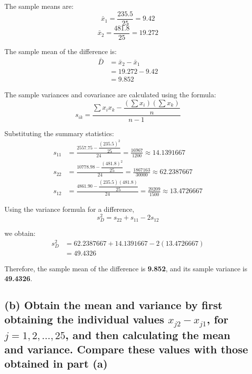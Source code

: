 \documentclass[12pt]{article}
\begin{document}
\vspace{0.2cm}

The sample means are:
\[
\bar{x}_1 = \frac{235.5}{25} = 9.42
\]
\[
\bar{x}_2 = \frac{481.8}{25} = 19.272
\]

\vspace{0.2cm}

The sample mean of the difference is:
\begin{align*}
\bar{D} &= \bar{x}_2 - \bar{x}_1 \\
&= 19.272 - 9.42 \\
&= \boxed{9.852}
\end{align*}

\vspace{0.2cm}

The sample variances and covariance are calculated using the formula:
\[
s_{ik} = \frac{\sum x_i x_k - \dfrac{(\sum x_i)(\sum x_k)}{n}}{n - 1}
\]

\vspace{0.2cm}

Substituting the summary statistics:
\begin{align*}
s_{11} &= \frac{2557.75 - \dfrac{(235.5)^2}{25}}{24} = \frac{16967}{1200} \approx 14.1391667 \\[1em]
s_{22} &= \frac{10778.98 - \dfrac{(481.8)^2}{25}}{24} = \frac{1867163}{30000} \approx 62.2387667 \\[1em]
s_{12} &= \frac{4861.90 - \dfrac{(235.5)(481.8)}{25}}{24} = \frac{20209}{1500} \approx 13.4726667
\end{align*}

\vspace{0.2cm}

Using the variance formula for a difference,
\[
s_D^2 = s_{22} + s_{11} - 2s_{12}
\]

\vspace{0.2cm}

we obtain:
\begin{align*}
s_D^2 &= 62.2387667 + 14.1391667 - 2(13.4726667) \\
&= \boxed{49.4326}
\end{align*}

\vspace{0.2cm}

Therefore, the sample mean of the difference is \textbf{9.852}, and its sample variance is \textbf{49.4326}.

\vspace{0.2cm}

\subsection*{(b) Obtain the mean and variance by first obtaining the individual values $x_{j2} - x_{j1}$, for $j = 1, 2, \dots, 25$, and then calculating the mean and variance. Compare these values with those obtained in part (a)}
\end{document}

